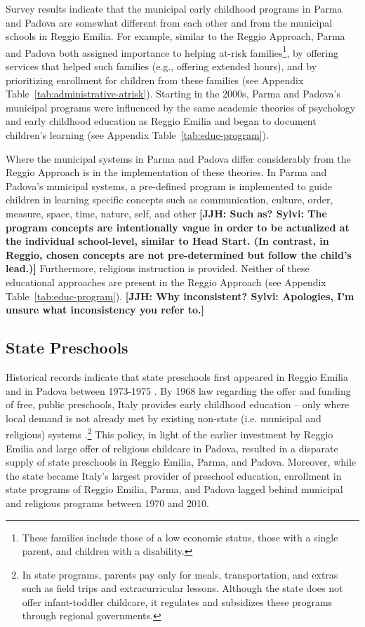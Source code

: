 Survey results indicate that the municipal early childhood programs in Parma and Padova are somewhat different from each other and from the municipal schools in Reggio Emilia. For example, similar to the Reggio Approach, Parma and Padova both assigned importance to helping at-risk families\footnote{These families include those of a low economic status, those with a single parent, and children with a disability.}, by offering services that helped such families (e.g., offering extended hours), and by prioritizing enrollment for children from these families (see Appendix Table~\ref{tab:administrative-atrisk}). Starting in the 2000s, Parma and Padova's municipal programs were influenced by the same academic theories of psychology and early childhood education as Reggio Emilia and began to document children's learning (see Appendix Table~\ref{tab:educ-program}). 

Where the municipal systems in Parma and Padova differ considerably from the Reggio Approach is in the implementation of these theories. In Parma and Padova's municipal systems, a pre-defined program is implemented to guide children in learning specific concepts such as communication, culture, order, measure, space, time, nature, self, and other \textbf{[JJH: Such as? Sylvi: The program concepts are intentionally vague in order to be actualized at the individual school-level, similar to Head Start. (In contrast, in Reggio, chosen concepts are not pre-determined but follow the child's lead.)]} Furthermore, religious instruction is provided. Neither of these educational approaches are present in the Reggio Approach (see Appendix Table~\ref{tab:educ-program}).  \textbf{[JJH: Why inconsistent? Sylvi: Apologies, I'm unsure what inconsistency you refer to.]}

\subsection{State Preschools}

Historical records indicate that state preschools first appeared in Reggio Emilia and in Padova between 1973-1975 \citep{Padova-Admin-Data_1964-2011,Reggio-Admin-data_1966-2006,Reggio-Annual-Journals_1994-2011}. By 1968 law regarding the offer and funding of free, public preschools, Italy provides early childhood education -- only where local demand is not already met by existing non-state (i.e. municipal and religious) systems \citep{Hohnerlein_2009_Paradox-Public-Preschools}.\footnote{In state programs, parents pay only for meals, transportation, and extras such as field trips and extracurricular lessons. Although the state does not offer infant-toddler childcare, it regulates and subsidizes these programs through regional governments.} This policy, in light of the earlier investment by Reggio Emilia and large offer of religious childcare in Padova, resulted in a disparate supply of state preschools in Reggio Emilia, Parma, and Padova. Moreover, while the state became Italy's largest provider of preschool education, enrollment in state programs of Reggio Emilia, Parma, and Padova lagged behind municipal and religious programs between 1970 and 2010. 

